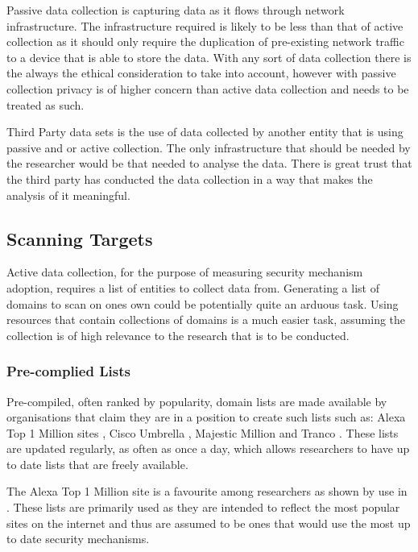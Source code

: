 \documentclass{mscreport}
\begin{document}
\vspace{0.3cm} \noindent
Passive data collection is capturing data as it flows through network infrastructure. The infrastructure required is likely to be less than that of active collection as it should only require the duplication of pre-existing network traffic to a device that is able to store the data. With any sort of data collection there is the always the ethical consideration to take into account, however with passive collection privacy is of higher concern than active data collection and needs to be treated as such.

\vspace{0.3cm} \noindent
Third Party data sets is the use of data collected by another entity that is using passive and or active collection. The only infrastructure that should be needed by the researcher would be that needed to analyse the data. There is great trust that the third party has conducted the data collection in a way that makes the analysis of it meaningful.

\subsection{Scanning Targets}
Active data collection, for the purpose of measuring security mechanism adoption, requires a list of entities to collect data from. Generating a list of domains to scan on ones own could be potentially quite an arduous task. Using resources that contain collections of domains is a much easier task, assuming the collection is of high relevance to the research that is to be conducted.

\subsubsection{Pre-complied Lists}

Pre-compiled, often ranked by popularity, domain lists are made available by organisations that claim they are in a position to create such lists such as: Alexa Top 1 Million sites \cite{noauthor_undated-wh}, Cisco Umbrella \cite{noauthor_undated-ku}, Majestic Million \cite{noauthor_undated-sz} and Tranco \cite{noauthor_undated-mt}. These lists are updated regularly, as often as once a day, which allows researchers to have up to date lists that are freely available.

\vspace{0.3cm} \noindent
The Alexa Top 1 Million site is a favourite among researchers as shown by use in \cite{Buchanan2018-xz,Chen2016-dl,Kumar2017-qw,Patil2017-bg,Ying2016-ag,Michael2015-hn,Van_Goethem2014-ao,Holz2020-ha,Poteat2021-zr}. These lists are primarily used as they are intended to reflect the most popular sites on the internet and thus are assumed to be ones that would use the most up to date security mechanisms.
\end{document}
